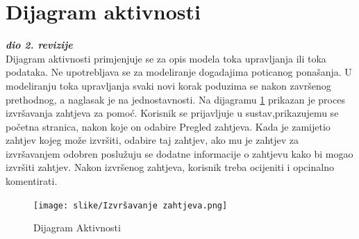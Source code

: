\newpage
		\section{Dijagram aktivnosti}
			
			\textbf{\textit{dio 2. revizije}}\\
			
			\text Dijagram aktivnosti primjenjuje se za opis modela toka upravljanja ili toka podataka. Ne upotrebljava se za modeliranje dogadajima poticanog ponašanja. U modeliranju toka upravljanja svaki novi korak poduzima se nakon završenog prethodnog, a naglasak je na jednostavnosti. Na dijagramu \ref{fig:4.11} prikazan je proces izvršavanja zahtjeva za pomoć. Korisnik se prijavljuje u sustav,prikazujemu se početna stranica, nakon koje on odabire Pregled zahtjeva. Kada je zamijetio zahtjev kojeg može izvršiti, odabire taj zahtjev, ako mu je zahtjev za izvršavanjem odobren poslužuju se dodatne informacije o zahtjevu kako bi mogao izvršiti zahtjev. Nakon izvršenog zahtjeva, korisnik treba ocijeniti i opcinalno komentirati.
			
			
		\begin{figure}[H]
			\texttt{[image: slike/Izvršavanje zahtjeva.png]} %
			\centering
			\caption { Dijagram Aktivnosti}
			\label{fig:4.11}
			\end{figure}

\newpage
